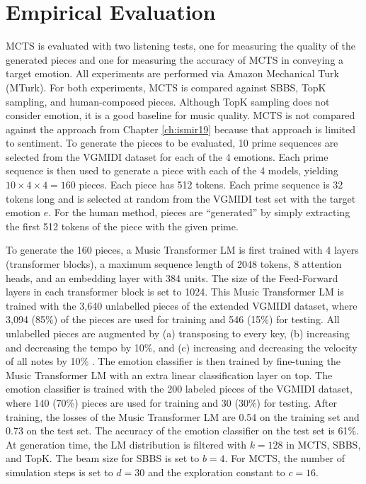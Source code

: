 \section{Empirical Evaluation}

MCTS is evaluated with two listening tests, one for measuring the quality of the generated pieces and one for measuring the accuracy of MCTS in conveying a target emotion. All experiments are performed via Amazon Mechanical Turk (MTurk). For both experiments, MCTS is compared against SBBS, TopK sampling, and human-composed pieces. Although TopK sampling does not consider emotion, it is a good baseline for music quality. MCTS is not compared against the approach from Chapter \ref{ch:ismir19} because that approach is limited to sentiment. To generate the pieces to be evaluated, 10 prime sequences are selected from the VGMIDI dataset for each of the 4 emotions. Each prime sequence is then used to generate a piece with each of the 4 models, yielding $10\times4\times4 = 160$ pieces. Each piece has 512 tokens. Each prime sequence is 32 tokens long and is selected at random from the VGMIDI test set with the target emotion $e$. For the human method, pieces are ``generated'' by simply extracting the first 512 tokens of the piece with the given prime.

To generate the 160 pieces, a Music Transformer LM is first trained with 4 layers (transformer blocks), a maximum sequence length of 2048 tokens, 8 attention heads, and an embedding layer with 384 units. The size of the Feed-Forward layers in each transformer block is set to 1024. This Music Transformer LM is trained with the 3,640 unlabelled pieces of the extended VGMIDI dataset, where 3,094 (85\%) of the pieces are used for training and 546 (15\%) for testing. All unlabelled pieces are augmented by (a) transposing to every key, (b) increasing and decreasing the tempo by 10\%, and (c) increasing and decreasing the velocity of all notes by 10\% \cite{oore2017learning}. The emotion classifier is then trained by fine-tuning the Music Transformer LM with an extra linear classification layer on top. The emotion classifier is trained with the 200 labeled pieces of the VGMIDI dataset, where 140 (70\%) pieces are used for training and 30 (30\%) for testing. After training, the losses of the Music Transformer LM are 0.54 on the training set and 0.73 on the test set. The accuracy of the emotion classifier on the test set is 61\%. At generation time, the LM distribution is filtered with $k = 128$ in MCTS, SBBS, and TopK. The beam size for SBBS is set to $b = 4$. For MCTS, the number of simulation steps is set to $d = 30$ and the exploration constant to $c = 16$.

